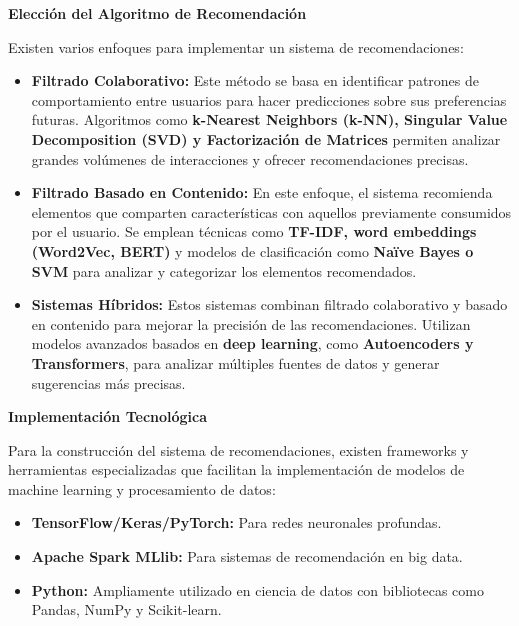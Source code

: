\documentclass[14pt]{extarticle}
\begin{document}
\begin{enumerate}
    \vspace{0.3cm}
    \textbf{Elección del Algoritmo de Recomendación}

    Existen varios enfoques para implementar un sistema de recomendaciones:

    \begin{itemize}
      \item \textbf{Filtrado Colaborativo:} Este método se basa en identificar patrones de comportamiento entre usuarios para hacer predicciones sobre sus preferencias futuras. Algoritmos como \textbf{k-Nearest Neighbors (k-NN), Singular Value Decomposition (SVD) y Factorización de Matrices} permiten analizar grandes volúmenes de interacciones y ofrecer recomendaciones precisas.

      \item \textbf{Filtrado Basado en Contenido:} En este enfoque, el sistema recomienda elementos que comparten características con aquellos previamente consumidos por el usuario. Se emplean técnicas como \textbf{TF-IDF, word embeddings (Word2Vec, BERT)} y modelos de clasificación como \textbf{Naïve Bayes o SVM} para analizar y categorizar los elementos recomendados.

      \item \textbf{Sistemas Híbridos:} Estos sistemas combinan filtrado colaborativo y basado en contenido para mejorar la precisión de las recomendaciones. Utilizan modelos avanzados basados en \textbf{deep learning}, como \textbf{Autoencoders y Transformers}, para analizar múltiples fuentes de datos y generar sugerencias más precisas.
    \end{itemize}

    \textbf{Implementación Tecnológica}

    Para la construcción del sistema de recomendaciones, existen frameworks y herramientas especializadas que facilitan la implementación de modelos de machine learning y procesamiento de datos:

    \begin{itemize}
      \item \textbf{TensorFlow/Keras/PyTorch:} Para redes neuronales profundas.

      \item \textbf{Apache Spark MLlib:} Para sistemas de recomendación en big data.

      \item \textbf{Python:} Ampliamente utilizado en ciencia de datos con bibliotecas como Pandas, NumPy y Scikit-learn.
    \end{itemize}


\end{enumerate}
\end{document}
